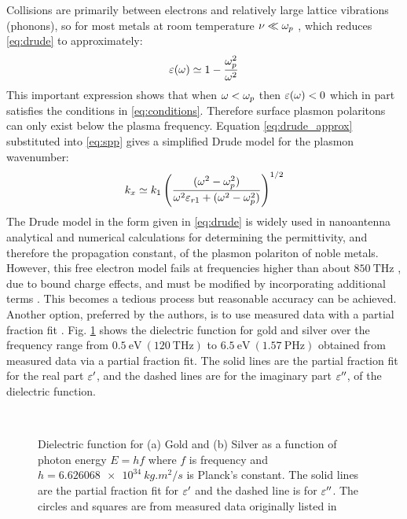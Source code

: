 \documentclass[11pt]{article}
\begin{document}
Collisions are primarily between electrons and relatively large lattice vibrations (phonons), so for most metals at room temperature  $\nu \ll \omega_p $ \cite{Bohren1998}, which reduces \eqref{eq:drude} to approximately:
%
\begin{equation}
  \varepsilon(\omega) \simeq 1 - \frac{\omega_p^2}{\omega^2}
  \label{eq:drude_approx}
\end{equation}
%
This important expression shows that when $\omega < \omega_p$ then $\varepsilon(\omega) < 0$  which in part satisfies the conditions in \eqref{eq:conditions}. Therefore surface plasmon polaritons can only exist below the plasma frequency. Equation \eqref{eq:drude_approx} substituted into \eqref{eq:spp} gives a simplified Drude model for the plasmon wavenumber:
%
\begin{equation}
  k_x \simeq k_1 \left( \frac{(\omega^2 - \omega_p^2)}{\omega^2 \varepsilon_{r1} + (\omega^2 - \omega_p^2)} \right)^{1/2}
  \label{eq:kx_approx}
\end{equation}
%
The Drude model in the form given in \eqref{eq:drude} is widely used in nanoantenna analytical and numerical calculations for determining the permittivity, and therefore the propagation constant, of the plasmon polariton of noble metals. However, this free electron model fails at frequencies higher than about $850~\mathrm{THz}$ \cite{Archambault2009}, due to bound charge effects, and must be modified by incorporating additional terms \cite{Bohren1998}. This becomes a tedious process but reasonable accuracy can be achieved. Another option, preferred by the authors, is to use measured data \cite{Lynch1997} with a partial fraction fit \cite{Michalski2013}. Fig. \ref{fig:permittivity} shows the dielectric function for gold and silver over the frequency range from $0.5~\mathrm{eV}~(120~\mathrm{THz})$ to $6.5~\mathrm{eV}~(1.57~\mathrm{PHz})$ obtained from measured data via a partial fraction fit. The solid lines are the partial fraction fit for the real part $\varepsilon'$, and the dashed lines are for the imaginary part
$\varepsilon''$, of the dielectric function.
%
\begin{figure}[t!]
  \centering
   \\
  \caption{Dielectric function for (a) Gold and (b) Silver as a function of  photon energy $E = hf$ where $f$ is frequency and $h = \SI{6.626068e34} {kg.m^{2}/s}$ is Planck's constant. The solid lines are the partial fraction fit for $\varepsilon'$ and the dashed line is for $\varepsilon''$. The circles and squares are from measured data originally listed in \cite{Johnson1972}}
  \label{fig:permittivity}
\end{figure}
\end{document}
